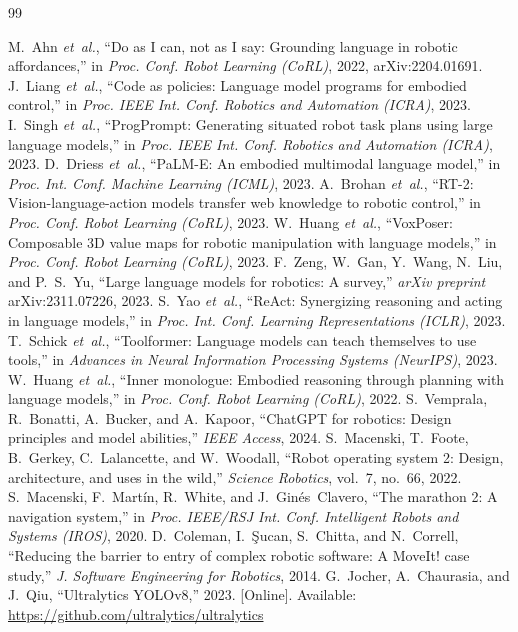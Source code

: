 \documentclass[conference]{IEEEtran}
\begin{document}
\begin{thebibliography}{99}

M.~Ahn \emph{et~al.}, ``Do as {I} can, not as {I} say: Grounding language
in robotic affordances,'' in \emph{Proc. Conf. Robot Learning (CoRL)},
2022, arXiv:2204.01691.
J.~Liang \emph{et~al.}, ``Code as policies: Language model programs for
embodied control,'' in \emph{Proc. IEEE Int. Conf. Robotics and
Automation (ICRA)}, 2023.
I.~Singh \emph{et~al.}, ``{ProgPrompt}: Generating situated robot task
plans using large language models,'' in \emph{Proc. IEEE Int. Conf.
Robotics and Automation (ICRA)}, 2023.
D.~Driess \emph{et~al.}, ``{PaLM-E}: An embodied multimodal language
model,'' in \emph{Proc. Int. Conf. Machine Learning (ICML)}, 2023.
A.~Brohan \emph{et~al.}, ``{RT-2}: Vision-language-action models transfer
web knowledge to robotic control,'' in \emph{Proc. Conf. Robot Learning
(CoRL)}, 2023.
W.~Huang \emph{et~al.}, ``{VoxPoser}: Composable {3D} value maps for robotic
manipulation with language models,'' in \emph{Proc. Conf. Robot Learning
(CoRL)}, 2023.
F.~Zeng, W.~Gan, Y.~Wang, N.~Liu, and P.~S.~Yu, ``Large language models for
robotics: A survey,'' \emph{arXiv preprint} arXiv:2311.07226, 2023.
S.~Yao \emph{et~al.}, ``{ReAct}: Synergizing reasoning and acting in
language models,'' in \emph{Proc. Int. Conf. Learning Representations
(ICLR)}, 2023.
T.~Schick \emph{et~al.}, ``{Toolformer}: Language models can teach
themselves to use tools,'' in \emph{Advances in Neural Information
Processing Systems (NeurIPS)}, 2023.
W.~Huang \emph{et~al.}, ``Inner monologue: Embodied reasoning through
planning with language models,'' in \emph{Proc. Conf. Robot Learning
(CoRL)}, 2022.
S.~Vemprala, R.~Bonatti, A.~Bucker, and A.~Kapoor, ``{ChatGPT} for
robotics: Design principles and model abilities,'' \emph{IEEE Access},
2024.
S.~Macenski, T.~Foote, B.~Gerkey, C.~Lalancette, and W.~Woodall, ``Robot
operating system 2: Design, architecture, and uses in the wild,''
\emph{Science Robotics}, vol.~7, no.~66, 2022.
S.~Macenski, F.~Mart\'in, R.~White, and J.~Ginés~Clavero, ``The marathon
2: A navigation system,'' in \emph{Proc. IEEE/RSJ Int. Conf. Intelligent
Robots and Systems (IROS)}, 2020.
D.~Coleman, I.~\c{S}ucan, S.~Chitta, and N.~Correll, ``Reducing the
barrier to entry of complex robotic software: A {MoveIt!} case study,''
\emph{J. Software Engineering for Robotics}, 2014.
G.~Jocher, A.~Chaurasia, and J.~Qiu, ``Ultralytics {YOLOv8},'' 2023.
[Online]. Available: \url{https://github.com/ultralytics/ultralytics}
\end{thebibliography}
\end{document}
